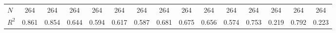 \begin{table}[htbp]
\begin{tabular}{l*{14}{c}}
\hline
\(N\)       &         264         &         264         &         264         &         264         &         264         &         264         &         264         &         264         &         264         &         264         &         264         &         264         &         264         &         264         \\
\(R^{2}\)   &       0.861         &       0.854         &       0.644         &       0.594         &       0.617         &       0.587         &       0.681         &       0.675         &       0.656         &       0.574         &       0.753         &       0.219         &       0.792         &       0.223         \\
\hline\hline
\end{tabular}
\end{table}
